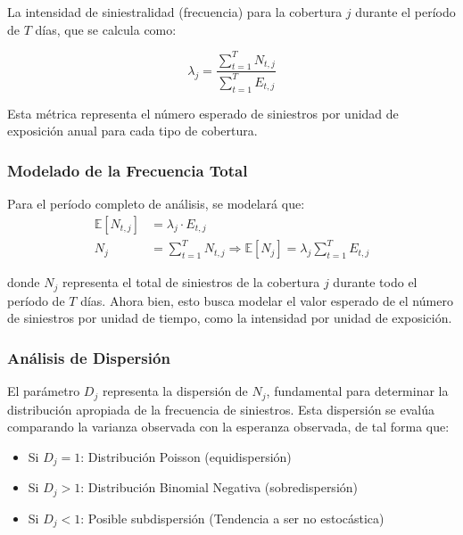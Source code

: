 La intensidad de siniestralidad (frecuencia) para la cobertura $j$ durante el período de $T$ días, que se calcula como:

\begin{equation*}
\lambda_j = \frac{\sum_{t=1}^{T} N_{t,j}}{\sum_{t=1}^{T} E_{t,j}}
\end{equation*}

Esta métrica representa el número esperado de siniestros por unidad de exposición anual para cada tipo de cobertura.

\subsubsection{Modelado de la Frecuencia Total}

Para el período completo de análisis, se modelará que:
\begin{align*}
\mathbb{E}[N_{t,j}] &= \lambda_j \cdot E_{t,j} \\
N_j &= \sum_{t=1}^{T} N_{t,j} \Rightarrow \mathbb{E}[N_j] = \lambda_j \sum_{t=1}^{T} E_{t,j}
\end{align*}

donde $N_j$ representa el total de siniestros de la cobertura $j$ durante todo el período de $T$ días. Ahora bien, esto busca modelar el valor esperado de el número de siniestros por unidad de tiempo, como la intensidad por unidad de exposición.

\subsubsection{Análisis de Dispersión}

El parámetro $D_j$ representa la dispersión de $N_j$, fundamental para determinar la distribución apropiada de la frecuencia de siniestros. Esta dispersión se evalúa comparando la varianza observada con la esperanza observada, de tal forma que:

\begin{itemize}
    \item Si $D_j = 1$: Distribución Poisson (equidispersión)
    \item Si $D_j > 1$: Distribución Binomial Negativa (sobredispersión)
    \item Si $D_j < 1$: Posible subdispersión (Tendencia a ser no estocástica)
\end{itemize}
